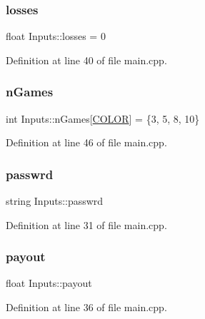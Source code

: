 \subsubsection{\texorpdfstring{losses}{losses}}
{\footnotesize\ttfamily float Inputs\+::losses = 0}



Definition at line 40 of file main.\+cpp.

\mbox{\label{struct_inputs_a8b7271740a32d3d765130231e98dee68}} 
\subsubsection{\texorpdfstring{n\+Games}{nGames}}
{\footnotesize\ttfamily int Inputs\+::n\+Games\mbox{[}\hyperlink{main_8cpp_aa6d8034c897057de595a4511a4e7a837}{C\+O\+L\+OR}\mbox{]} = \{3, 5, 8, 10\}}



Definition at line 46 of file main.\+cpp.

\mbox{\label{struct_inputs_a8c55eda886194176c889c08a30a669a6}} 
\subsubsection{\texorpdfstring{passwrd}{passwrd}}
{\footnotesize\ttfamily string Inputs\+::passwrd}



Definition at line 31 of file main.\+cpp.

\mbox{\label{struct_inputs_ae019de875b0b547d9f6ff125068762c0}} 
\subsubsection{\texorpdfstring{payout}{payout}}
{\footnotesize\ttfamily float Inputs\+::payout}



Definition at line 36 of file main.\+cpp.

\mbox{\label{struct_inputs_a3ec027582343b553787b0e956a84bfae}} 

